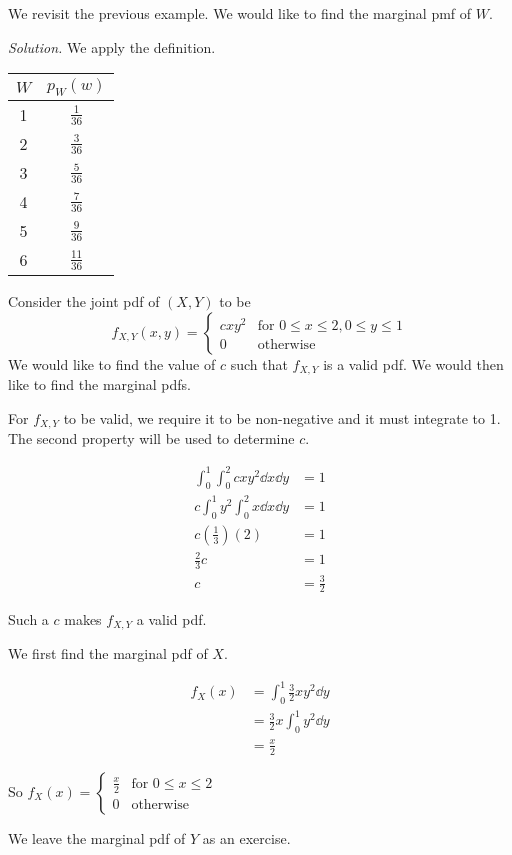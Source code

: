 \begin{example}[]
	We revisit the previous example. We would like to find the marginal pmf of $W$.

	\textit{Solution.} We apply the definition.
	\begin{center}
	\begin{tabular}{c | c}
		$W$ & $p_W(w)$\\ \hline
		1 & $\frac{1}{36}$\\
		2 & $\frac{3}{36}$\\
		3 & $\frac{5}{36}$\\
		4 & $\frac{7}{36}$\\
		5 & $\frac{9}{36}$\\
		6 & $\frac{11}{36}$
	\end{tabular}
	\end{center}
\end{example}


\begin{example}[]
	Consider the joint pdf of $(X,Y)$ to be
	$$f_{X,Y}(x,y)=\begin{cases}
		cxy^2 & \text{for $0\leq x\leq 2,0\leq y\leq 1$}\\
		0 & \text{otherwise}
	\end{cases}$$
	We would like to find the value of $c$ such that $f_{X,Y}$ is a valid pdf. We would then like to find the marginal pdfs.

	For $f_{X,Y}$ to be valid, we require it to be non-negative and it must integrate to 1. The second property will be used to determine $c$.

	\begin{align*}
		\int_0^1\int_0^2 cxy^2\dd x\dd y & =1\\
		c\int_0^1y^2\int_0^2 x\dd x\dd y & =1\\
		c\left(\frac 13\right)(2)&=1\\
		\frac 23 c&=1\\
		c&=\frac 32
	\end{align*}

	Such a $c$ makes $f_{X,Y}$ a valid pdf.

	We first find the marginal pdf of $X$.

	\begin{align*}
		f_X(x)&=\int_0^1\frac 32xy^2\dd y\\
		&=\frac 32x\int_0^1y^2\dd y\\
		&=\frac x2
	\end{align*}

	So $f_X(x)=\begin{cases}
		\frac x 2 & \text{for $0\leq x\leq 2$}\\
		0 & \text{otherwise}
	\end{cases}$

	We leave the marginal pdf of $Y$ as an exercise.
\end{example}

